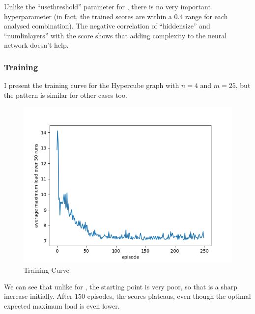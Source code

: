 Unlike the ``use\textunderscore threshold'' parameter for \TwoThinning, there is no very important hyperparameter (in fact, the trained scores are within a $0.4$ range for each analysed combination). The negative correlation of ``hidden\textunderscore size'' and ``num\textunderscore lin\textunderscore layers'' with the score shows that adding complexity to the neural network doesn't help.


\subsubsection{Training}

I present the training curve for the Hypercube graph with $n=4$ and $m=25$, but the pattern is similar for other cases too.


\begin{figure}[hbt!] \label{graphical-two-choice-hyperparameter-importance}
    \centering
    \includegraphics[scale=1.0]{Chapter4/Figs/training_progression_hypercube_4_25.png}
    \caption{\GraphicalTwoChoice Training Curve}
\end{figure}

We can see that unlike for \TwoThinning, the starting point is very poor, so that is a sharp increase initially. After $150$ episodes, the scores plateaus, even though the optimal expected maximum load is even lower.
